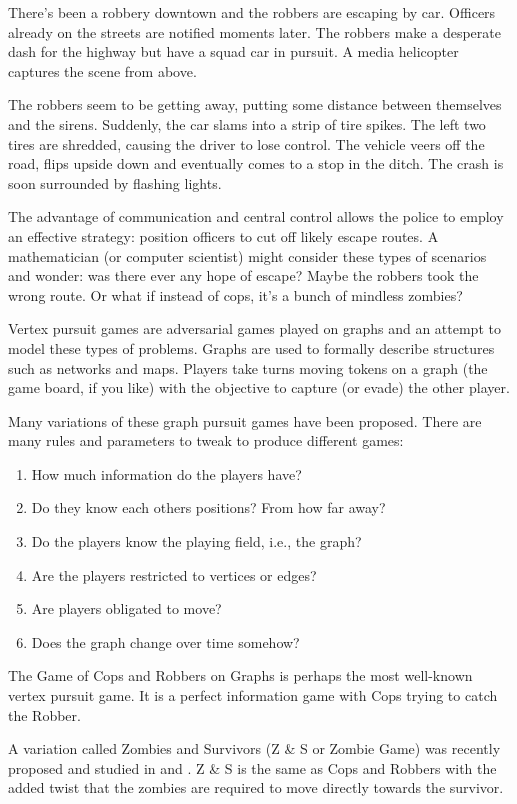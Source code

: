 There's been a robbery downtown and the robbers are escaping by car. Officers
already on the streets are notified moments later. The robbers make a desperate dash for the highway but have a squad car in pursuit. A media helicopter captures the scene from above.

The robbers seem to be getting away, putting some distance between themselves and the sirens.
Suddenly, the car slams into a strip of tire spikes. The left two tires are shredded,
causing the driver to lose control. The vehicle veers off the road, flips upside down
and eventually comes to a stop in the ditch. The crash is soon surrounded by
flashing lights.

The advantage of communication and central control allows the police to employ
 an effective strategy: position officers to cut off likely escape routes. A mathematician
 (or computer scientist) might consider these types of scenarios and wonder:
 was there ever any hope of escape? Maybe the robbers took the wrong route.
 Or what if instead of cops, it's a bunch of mindless zombies?

Vertex pursuit games are adversarial games played on graphs and an attempt
to model these types of problems.
Graphs are used to formally describe structures such as networks and
maps. Players take turns moving tokens on a graph (the game board, if you like) with
the objective to capture (or evade) the other player.

Many variations of these graph pursuit games have been proposed. There are many rules and
parameters to tweak to produce different games:

\begin{enumerate}
\item How much information do the players have?
\item Do they know each others positions? From how far away?
\item Do the players know the playing field, i.e., the graph?
\item Are the players restricted to vertices or edges?
\item Are players obligated to move?
\item Does the graph change over time somehow?
\end{enumerate}

The Game of Cops and Robbers on Graphs \cite{bonato2011game} is perhaps the most
well-known vertex pursuit game. It is a perfect information game with Cops trying
to catch the Robber.

A variation called Zombies and Survivors (Z \& S or Zombie Game) was recently proposed and studied in \cite{fitzpatrick2016deterministic} and \cite{fitzpatrick2018game}.
Z \& S is the same as Cops and Robbers with the added twist that the zombies are required to move directly towards the survivor.


